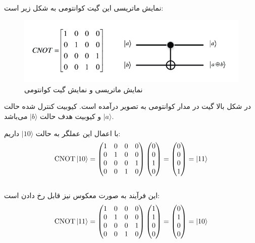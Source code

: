 \documentclass{book}
\begin{document}
نمایش ماتریسی این گیت کوانتومی به شکل زیر است:
\begin{figure}[ht]
	\centering
	\includegraphics[width=\linewidth]{Matrix-representation-and-quantum-circuit-of-CNOT-gate.png}
	\caption{نمایش ماتریسی و نمایش گیت کوانتومی }
	\label{CNOT}
\end{figure}


در شکل بالا گیت  در مدار کوانتومی به تصویر درآمده است. کیوبیت کنترل شده  حالت $\vert a \rangle$ و کیوبیت هدف حالت $\vert b \rangle$ می‌باشد.


با اعمال این عملگر به حالت $\vert 10\rangle$ داریم:
$$
\text{CNOT} \ket{10} = \begin{pmatrix}
	1 & 0 & 0 & 0 \\
	0 & 1 & 0 & 0 \\
	0 & 0 & 0 & 1 \\
	0 & 0 & 1 & 0
\end{pmatrix} \begin{pmatrix}
	0 \\
	0 \\
	1 \\
	0
\end{pmatrix} = \begin{pmatrix}
	0 \\
	0 \\
	0 \\
	1
\end{pmatrix} = \ket{11}
$$\\

این فرآیند به صورت معکوس نیز قابل رخ دادن است:\\

$$
\text{CNOT} \ket{11} = \begin{pmatrix}
	1 & 0 & 0 & 0 \\
	0 & 1 & 0 & 0 \\
	0 & 0 & 0 & 1 \\
	0 & 0 & 1 & 0
\end{pmatrix} \begin{pmatrix}
	1 \\
	1 \\
	0 \\
	0
\end{pmatrix} = \begin{pmatrix}
	0 \\
	1 \\
	0 \\
	0
\end{pmatrix} = \ket{10}
$$
\vspace{2cm}
\end{document}

